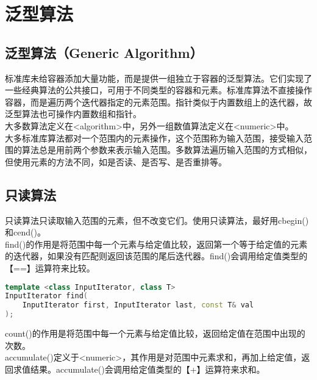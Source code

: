 \section{泛型算法}

\subsection{泛型算法（Generic Algorithm）}

标准库未给容器添加大量功能，而是提供一组独立于容器的泛型算法。它们实现了一些经典算法的公共接口，可用于不同类型的容器和元素。标准库算法不直接操作容器，而是遍历两个迭代器指定的元素范围。指针类似于内置数组上的迭代器，故泛型算法也可操作内置数组和指针。 \\

大多数算法定义在<algorithm>中，另外一组数值算法定义在<numeric>中。 \\

大多标准库算法都对一个范围内的元素操作，这个范围称为输入范围，接受输入范围的算法总是用前两个参数来表示输入范围。多数算法遍历输入范围的方式相似，但使用元素的方法不同，如是否读、是否写、是否重排等。 \\

\subsection{只读算法}

只读算法只读取输入范围的元素，但不改变它们。使用只读算法，最好用cbegin()和cend()。 \\

find()的作用是将范围中每一个元素与给定值比较，返回第一个等于给定值的元素的迭代器，如果没有匹配则返回该范围的尾后迭代器。find()会调用给定值类型的【==】运算符来比较。

\vspace{-0.5cm}

\begin{lstlisting}[language=C++]
template <class InputIterator, class T>
InputIterator find(
	InputIterator first, InputIterator last, const T& val
);
\end{lstlisting}

count()的作用是将范围中每一个元素与给定值比较，返回给定值在范围中出现的次数。 \\

accumulate()定义于<numeric>，其作用是对范围中元素求和，再加上给定值，返回求值结果。accumulate()会调用给定值类型的【+】运算符来求和。

\vspace{-0.5cm}

